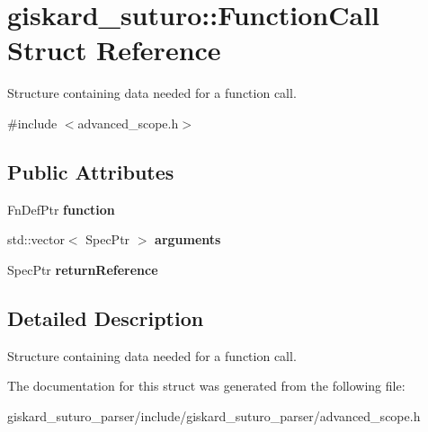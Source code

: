 \hypertarget{structgiskard__suturo_1_1FunctionCall}{\section{giskard\-\_\-suturo\-:\-:Function\-Call Struct Reference}
\label{structgiskard__suturo_1_1FunctionCall}
}


Structure containing data needed for a function call.  




{\ttfamily \#include $<$advanced\-\_\-scope.\-h$>$}

\subsection*{Public Attributes}
\begin{DoxyCompactItemize}
\item 
\hypertarget{structgiskard__suturo_1_1FunctionCall_a38322c530133415cdc18b386e4f3c598}{Fn\-Def\-Ptr {\bfseries function}}\label{structgiskard__suturo_1_1FunctionCall_a38322c530133415cdc18b386e4f3c598}

\item 
\hypertarget{structgiskard__suturo_1_1FunctionCall_a16141e925cddc23ae3397481942acbe9}{std\-::vector$<$ Spec\-Ptr $>$ {\bfseries arguments}}\label{structgiskard__suturo_1_1FunctionCall_a16141e925cddc23ae3397481942acbe9}

\item 
\hypertarget{structgiskard__suturo_1_1FunctionCall_af21b932d20f8129327e184efef65e345}{Spec\-Ptr {\bfseries return\-Reference}}\label{structgiskard__suturo_1_1FunctionCall_af21b932d20f8129327e184efef65e345}

\end{DoxyCompactItemize}


\subsection{Detailed Description}
Structure containing data needed for a function call. 

The documentation for this struct was generated from the following file\-:\begin{DoxyCompactItemize}
\item 
giskard\-\_\-suturo\-\_\-parser/include/giskard\-\_\-suturo\-\_\-parser/advanced\-\_\-scope.\-h\end{DoxyCompactItemize}
